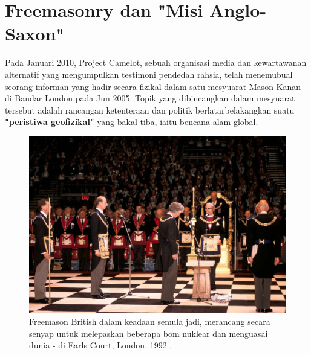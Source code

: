 \documentclass[10pt,twocolumn,letterpaper]{article}
\begin{document}
\section{Freemasonry dan "Misi Anglo-Saxon"}
Pada Januari 2010, Project Camelot, sebuah organisasi media dan kewartawanan alternatif yang mengumpulkan testimoni pendedah rahsia, telah menemubual \cite{4,6} seorang informan yang hadir secara fizikal dalam satu mesyuarat Mason Kanan di Bandar London pada Jun 2005. Topik yang dibincangkan dalam mesyuarat tersebut adalah rancangan ketenteraan dan politik berlatarbelakangkan suatu \textbf{"peristiwa geofizikal"} yang bakal tiba, iaitu bencana alam global.

\begin{figure}[b]
\begin{center}
   \includegraphics[width=1\linewidth]{freemason.jpg}
\end{center}
   \caption{Freemason British dalam keadaan semula jadi, merancang secara senyap untuk melepaskan beberapa bom nuklear dan menguasai dunia - di Earls Court, London, 1992 \cite{5}.}
\label{fig:1}
\label{fig:onecol}
\end{figure}
\end{document}
